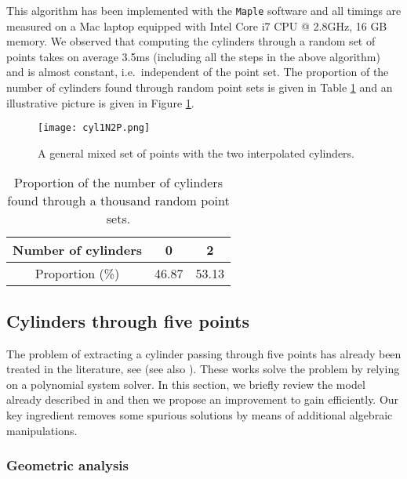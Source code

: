 \documentclass[5p]{elsarticle}
\newcommand{\com}[1]{{\color{black} #1}}
\newcommand{\lb}[1]{{\color{black} #1}}
\begin{document}
This algorithm has been implemented with the {\tt Maple} software and all timings are measured on a Mac laptop equipped with Intel Core i7 CPU @ 2.8GHz, 16 GB memory. We observed that \com{computing} the cylinders through a random set of points takes \com{on average} 3.5ms \com{(including all the steps \lb{in the above algorithm})} and is almost constant, \com{i.e.~independent} of the point set. 
The proportion of the number of cylinders found through random point sets is given in Table \ref{tab:cylinders} and an illustrative picture is given in Figure \ref{fig:cyl1N2P}.

\begin{figure}[ht!]
	\centering
	\texttt{[image: cyl1N2P.png]}		
\caption{A general mixed set of points with the two interpolated cylinders.}\label{fig:cyl1N2P}	
\end{figure}

\begin{table}[ht!]
\begin{center}
\begin{tabular}{c|c|c|}
Number of cylinders	 & 0 & 2  \\ 
	 \hline
Proportion (\%)	 &  46.87  & 53.13 \\
\hline	
\end{tabular}
\caption{Proportion of the number of cylinders found through a thousand random point sets.}\label{tab:cylinders}
\end{center}
\end{table}

\subsection{Cylinders through five points}

The problem of extracting a cylinder passing through five points has already been treated in the literature, see \cite{Devillers02,BKM05,Lichtblau12} \lb{(see also \cite{Chaperon:2001:ECF:647260.718511,Beder:2006:DSC:2094437.2094451})}. These works solve the problem by relying on a polynomial system solver. In this section, we briefly review the model already described in \cite{Devillers02} and then we propose an improvement to gain efficiently. Our key ingredient removes some spurious solutions by means of additional algebraic manipulations. 

\subsubsection{Geometric analysis}
\end{document}
